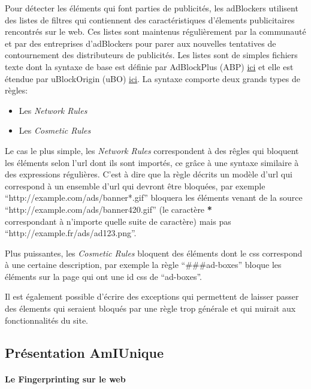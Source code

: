 \documentclass[oneside,a4paper,12pt]{article}
\begin{document}
Pour détecter les éléments qui font parties de publicités, les adBlockers utilisent des listes de filtres qui contiennent des caractéristiques d'élements publicitaires rencontrés sur le web. Ces listes sont maintenus régulièrement par la communauté et par des entreprises d'adBlockers pour parer aux nouvelles tentatives de contournement des distributeurs de publicités. Les listes sont de simples fichiers texte dont la syntaxe de base est définie par AdBlockPlus (ABP) \href{https://help.eyeo.com/en/adblockplus/how-to-write-filters#allowlist}{ici} et elle est étendue par uBlockOrigin (uBO) \href{https://github.com/gorhill/uBlock/wiki/Static-filter-syntax#extended-syntax}{ici}. La syntaxe comporte deux grands types de règles: 
\begin{itemize}
\item Les \textit{Network Rules}
\item Les \textit{Cosmetic Rules}
\end{itemize}
Le cas le plus simple, les \textit{Network Rules} correspondent à des rêgles qui bloquent les éléments selon l'url dont ils sont importés, ce grâce à une syntaxe similaire à des expressions régulières. C'est à dire que la règle décrits un modèle d'url qui correspond à un ensemble d'url qui devront être bloquées, par exemple ``http://example.com/ads/banner*.gif'' bloquera les éléments venant de la source ``http://example.com/ads/banner420.gif'' (le caractère \textbf{*}\\ correspondant à n'importe quelle suite de caractère) mais pas \\``http://example.fr/ads/ad123.png''.

Plus puissantes, les \textit{Cosmetic Rules} bloquent des éléments dont le css correspond à une certaine description, par exemple la règle ``\#\#\#ad-boxes'' bloque les éléments sur la page qui ont une id css de ``ad-boxes''.

Il est également possible d'écrire des exceptions qui permettent de laisser passer des élements qui seraient bloqués par une règle trop générale et qui nuirait aux fonctionnalités du site.

\subsection{Présentation AmIUnique}\label{Intro:amiunique}

\paragraph*{Le Fingerprinting sur le web}
\end{document}
